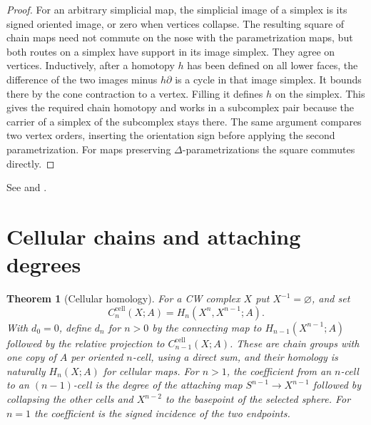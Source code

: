 \documentclass[11pt,oneside,openany]{book}
\theoremstyle{plain}
\newtheorem{theorem}{Theorem}[chapter]
\theoremstyle{definition}
\theoremstyle{remark}
\begin{document}
\begin{proof}
For an arbitrary simplicial map, the simplicial image of a
simplex is its signed oriented image, or zero when vertices
collapse. The resulting square of chain maps need not commute on
the nose with the parametrization maps, but both routes on a
simplex have support in its image simplex. They agree on vertices.
Inductively, after a homotopy \(h\) has been defined on all lower
faces, the difference of the two images minus \(h\partial\) is a
cycle in that image simplex. It bounds there by the cone
contraction to a vertex. Filling it defines \(h\) on the simplex.
This gives the required chain homotopy and works in a subcomplex
pair because the carrier of a simplex of the subcomplex stays
there. The same argument compares two vertex orders, inserting the
orientation sign before applying the second parametrization.
For maps preserving \(\Delta\)-parametrizations the square
commutes directly.
\end{proof}

See \cite[Section 2.1]{Hatcher} and \cite[Section 4.7]{MKP}.

\section{Cellular chains and attaching degrees}\label{p202:T20}

\begin{theorem}[Cellular homology]\label{thm:p202-cellular-comparison}
For a CW complex \(X\) put \(X^{-1}=\varnothing\), and set
\[
 C_n^{\mathrm{cell}}(X;A)=H_n(X^n,X^{n-1};A).
\]
With \(d_0=0\), define \(d_n\) for \(n>0\) by the connecting map
to \(H_{n-1}(X^{n-1};A)\) followed by the relative projection
to \(C_{n-1}^{\mathrm{cell}}(X;A)\). These are chain groups with
one copy of \(A\) per oriented \(n\)-cell, using a direct sum,
and their homology is naturally \(H_n(X;A)\) for cellular maps.
For \(n>1\), the coefficient from an \(n\)-cell to an
\((n-1)\)-cell is the degree of the attaching map
\(S^{n-1}\to X^{n-1}\) followed by collapsing the other cells and
\(X^{n-2}\) to the basepoint of the selected sphere. For \(n=1\)
the coefficient is the signed incidence of the two endpoints.
\end{theorem}
\end{document}
